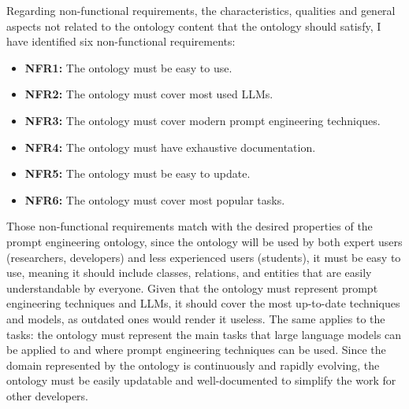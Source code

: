 Regarding non-functional requirements, the characteristics, qualities and general aspects not related to the ontology content that the ontology should satisfy, I have identified six non-functional requirements:
\begin{itemize}
    \item \textbf{NFR1:} The ontology must be easy to use.
    \item \textbf{NFR2:} The ontology must cover most used LLMs.
    \item \textbf{NFR3:} The ontology must cover modern prompt engineering techniques.
    \item \textbf{NFR4:} The ontology must have exhaustive documentation.
    \item \textbf{NFR5:} The ontology must be easy to update. 
    \item \textbf{NFR6:} The ontology must cover most popular tasks. 
\end{itemize}
Those non-functional requirements match with the desired properties of the prompt engineering ontology, since the ontology will be used by both expert users (researchers, developers) and less experienced users (students), it must be easy to use, meaning it should include classes, relations, and entities that are easily understandable by everyone. Given that the ontology must represent prompt engineering techniques and LLMs, it should cover the most up-to-date techniques and models, as outdated ones would render it useless. The same applies to the tasks: the ontology must represent the main tasks that large language models can be applied to and where prompt engineering techniques can be used. Since the domain represented by the ontology is continuously and rapidly evolving, the ontology must be easily updatable and well-documented to simplify the work for other developers.


\newpage
